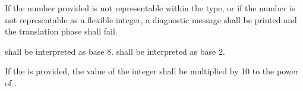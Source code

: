 \specsubitem
If the number provided is not representable within the type, or if the number
is not representable as a flexible integer, a diagnostic message shall be
printed and the translation phase shall fail.

\specsubitem
{} shall be interpreted as base 8.
 shall be interpreted as base 2.

\specsubitem
If the  is provided, the value of the
integer shall be multiplied by 10 to the power of .

\begin{grammar}
 \exactly \\
	\terminal{\textquotesingle}  \terminal{\textquotesingle} \\

 \\
	 \\
	 \\

 \exactly \\
	 \\
	   \\
	  \\
	  \\


 \exactly \\
	    \\

 \exactly \\
	  \\

 \oneof \\
	\terminal{\textbackslash\textbackslash}
	\terminal{\textbackslash\textquotesingle}
	 \\
\end{grammar}

